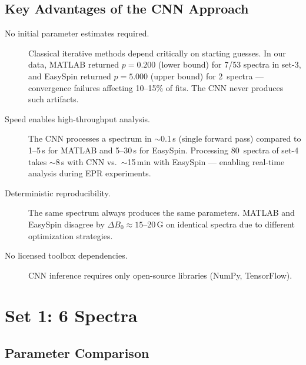 \documentclass[a4paper,11pt]{article}
\begin{document}
\subsection{Key Advantages of the CNN Approach}

\begin{description}
    \item[No initial parameter estimates required.]
    Classical iterative methods depend critically on starting guesses.
    In our data, MATLAB returned $p=0.200$ (lower bound) for 7/53 spectra
    in set-3, and EasySpin returned $p=5.000$ (upper bound) for 2~spectra
    --- convergence failures affecting 10--15\% of fits. The CNN never
    produces such artifacts.

    \item[Speed enables high-throughput analysis.]
    The CNN processes a spectrum in $\sim$0.1\,s (single forward pass)
    compared to 1--5\,s for MATLAB and 5--30\,s for EasySpin. Processing
    80~spectra of set-4 takes $\sim$8\,s with CNN vs.\ $\sim$15\,min with
    EasySpin --- enabling real-time analysis during EPR experiments.

    \item[Deterministic reproducibility.]
    The same spectrum always produces the same parameters. MATLAB and
    EasySpin disagree by $\Delta B_0 \approx 15$--20\,G on identical
    spectra due to different optimization strategies.

    \item[No licensed toolbox dependencies.]
    CNN inference requires only open-source libraries (NumPy, TensorFlow).
\end{description}


\newpage
\section{Set 1: 6 Spectra}

\subsection{Parameter Comparison}
\end{document}
